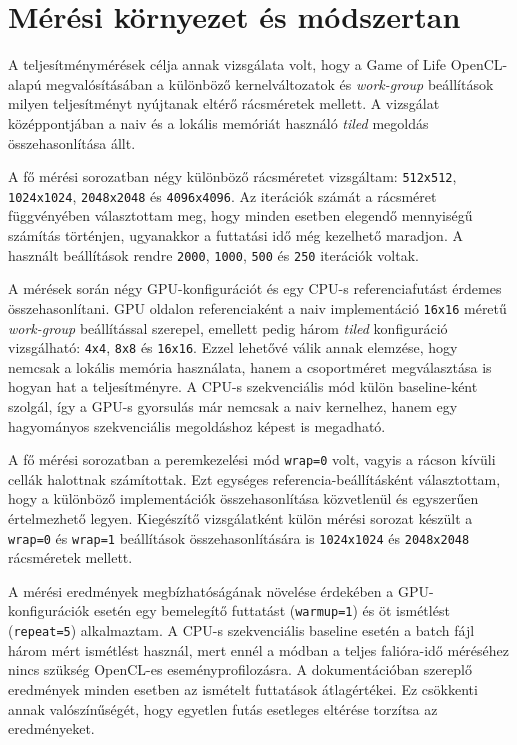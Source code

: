 \documentclass[12pt,a4paper]{article}
\begin{document}
\section{Mérési környezet és módszertan}

A teljesítménymérések célja annak vizsgálata volt, hogy a Game of Life OpenCL-alapú megvalósításában a különböző kernelváltozatok és \emph{work-group} beállítások milyen teljesítményt nyújtanak eltérő rácsméretek mellett. A vizsgálat középpontjában a naiv és a lokális memóriát használó \emph{tiled} megoldás összehasonlítása állt.

A fő mérési sorozatban négy különböző rácsméretet vizsgáltam: \texttt{512x512}, \texttt{1024x1024}, \texttt{2048x2048} és \texttt{4096x4096}. Az iterációk számát a rácsméret függvényében választottam meg, hogy minden esetben elegendő mennyiségű számítás történjen, ugyanakkor a futtatási idő még kezelhető maradjon. A használt beállítások rendre \texttt{2000}, \texttt{1000}, \texttt{500} és \texttt{250} iterációk voltak.

A mérések során négy GPU-konfigurációt és egy CPU-s referenciafutást érdemes összehasonlítani. GPU oldalon referenciaként a naiv implementáció \texttt{16x16} méretű \emph{work-group} beállítással szerepel, emellett pedig három \emph{tiled} konfiguráció vizsgálható: \texttt{4x4}, \texttt{8x8} és \texttt{16x16}. Ezzel lehetővé válik annak elemzése, hogy nemcsak a lokális memória használata, hanem a csoportméret megválasztása is hogyan hat a teljesítményre. A CPU-s szekvenciális mód külön baseline-ként szolgál, így a GPU-s gyorsulás már nemcsak a naiv kernelhez, hanem egy hagyományos szekvenciális megoldáshoz képest is megadható.

A fő mérési sorozatban a peremkezelési mód \texttt{wrap=0} volt, vagyis a rácson kívüli cellák halottnak számítottak. Ezt egységes referencia-beállításként választottam, hogy a különböző implementációk összehasonlítása közvetlenül és egyszerűen értelmezhető legyen. Kiegészítő vizsgálatként külön mérési sorozat készült a \texttt{wrap=0} és \texttt{wrap=1} beállítások összehasonlítására is \texttt{1024x1024} és \texttt{2048x2048} rácsméretek mellett.

A mérési eredmények megbízhatóságának növelése érdekében a GPU-konfigurációk esetén egy bemelegítő futtatást (\texttt{warmup=1}) és öt ismétlést (\texttt{repeat=5}) alkalmaztam. A CPU-s szekvenciális baseline esetén a batch fájl három mért ismétlést használ, mert ennél a módban a teljes falióra-idő méréséhez nincs szükség OpenCL-es eseményprofilozásra. A dokumentációban szereplő eredmények minden esetben az ismételt futtatások átlagértékei. Ez csökkenti annak valószínűségét, hogy egyetlen futás esetleges eltérése torzítsa az eredményeket.
\end{document}
